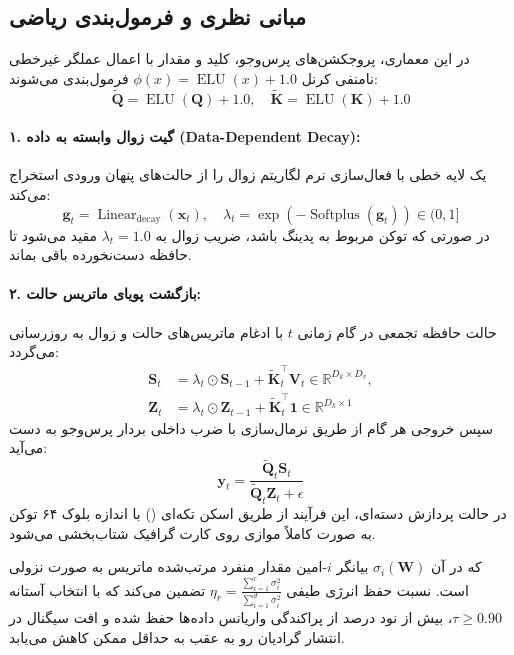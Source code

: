 \subsection{مبانی نظری و فرمول‌بندی ریاضی}
در این معماری، پروجکشن‌های پرس‌وجو، کلید و مقدار با اعمال عملگر غیرخطی نامنفی کرنل $\phi(x) = \operatorname{ELU}(x) + 1.0$ فرمول‌بندی می‌شوند:
\begin{equation}
\tilde{\mathbf{Q}} = \operatorname{ELU}(\mathbf{Q}) + 1.0, \quad \tilde{\mathbf{K}} = \operatorname{ELU}(\mathbf{K}) + 1.0
\end{equation}

\paragraph{۱. گیت زوال وابسته به داده (Data-Dependent Decay):}
یک لایه خطی با فعال‌سازی نرم  لگاریتم زوال را از حالت‌های پنهان ورودی استخراج می‌کند:
\begin{equation}
\mathbf{g}_t = \operatorname{Linear}_{\text{decay}}(\mathbf{x}_t), \quad \lambda_t = \exp\left(-\operatorname{Softplus}(\mathbf{g}_t)\right) \in (0, 1]
\end{equation}
در صورتی که توکن مربوط به پدینگ باشد، ضریب زوال به $\lambda_t = 1.0$ مقید می‌شود تا حافظه دست‌نخورده باقی بماند.

\paragraph{۲. بازگشت پویای ماتریس حالت:}
حالت حافظه تجمعی در گام زمانی $t$ با ادغام ماتریس‌های حالت و زوال به روزرسانی می‌گردد:
\begin{align}
\mathbf{S}_t &= \lambda_t \odot \mathbf{S}_{t-1} + \tilde{\mathbf{K}}_t^\top \mathbf{V}_t \in \mathbb{R}^{D_k \times D_v}, \\
\mathbf{Z}_t &= \lambda_t \odot \mathbf{Z}_{t-1} + \tilde{\mathbf{K}}_t^\top \mathbf{1} \in \mathbb{R}^{D_k \times 1}
\end{align}
سپس خروجی هر گام از طریق نرمال‌سازی با ضرب داخلی بردار پرس‌وجو به دست می‌آید:
\begin{equation}
\mathbf{y}_t = \frac{\tilde{\mathbf{Q}}_t \mathbf{S}_t}{\tilde{\mathbf{Q}}_t \mathbf{Z}_t + \epsilon}
\end{equation}
در حالت پردازش دسته‌ای، این فرآیند از طریق اسکن تکه‌ای () با اندازه بلوک ۶۴ توکن به صورت کاملاً موازی روی کارت گرافیک شتاب‌بخشی می‌شود.

که در آن $\sigma_i(\mathbf{W})$ بیانگر $i$-امین مقدار منفرد مرتب‌شده ماتریس به صورت نزولی است. نسبت حفظ انرژی طیفی $\eta_r = \frac{\sum_{i=1}^r \sigma_i^2}{\sum_{i=1}^{d} \sigma_i^2}$ تضمین می‌کند که با انتخاب آستانه $\tau \ge 0.90$، بیش از نود درصد از پراکندگی واریانس داده‌ها حفظ شده و افت سیگنال در انتشار گرادیان رو به عقب به حداقل ممکن کاهش می‌یابد.

